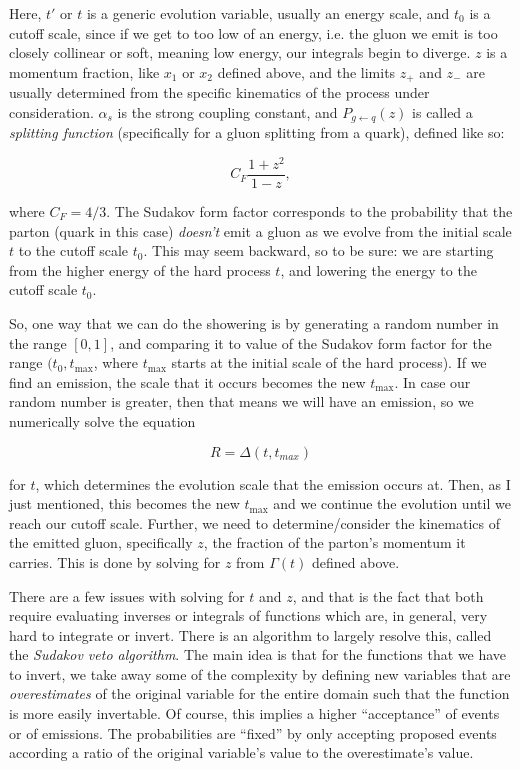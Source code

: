 Here, $t'$ or $t$ is a generic evolution variable, usually an energy scale, and $t_0$ is a cutoff scale, since if we get to too low of an energy, i.e. the gluon we emit is too closely collinear or soft, meaning low energy, our integrals begin to diverge. $z$ is a momentum fraction, like $x_1$ or $x_2$ defined above, and the limits $z_+$ and $z_-$ are usually determined from the specific kinematics of the process under consideration. $\alpha_s$ is the strong coupling constant, and $P_{g \leftarrow q}(z)$ is called a \textit{splitting function} (specifically for a gluon splitting from a quark), defined like so:

\begin{equation}
  C_F \frac{1 + z^2}{1 - z},
\end{equation}

where $C_F=4/3$. The Sudakov form factor corresponds to the probability that the parton (quark in this case) \textit{doesn't} emit a gluon as we evolve from the initial scale $t$ to the cutoff scale $t_0$. This may seem backward, so to be sure: we are starting from the higher energy of the hard process $t$, and lowering the energy to the cutoff scale $t_0$.

So, one way that we can do the showering is by generating a random number in the range $[0,1]$, and comparing it to value of the Sudakov form factor for the range $(t_0,t_{\mathrm{max}}$, where $t_{\mathrm{max}}$ starts at the initial scale of the hard process). If we find an emission, the scale that it occurs becomes the new $t_{\mathrm{max}}$. In case our random number is greater, then that means we will have an emission, so we numerically solve the equation

\begin{equation}
  R = \Delta(t,t_{max})
\end{equation}

for $t$, which determines the evolution scale that the emission occurs at. Then, as I just mentioned, this becomes the new $t_{\mathrm{max}}$ and we continue the evolution until we reach our cutoff scale. Further, we need to determine/consider the kinematics of the emitted gluon, specifically $z$, the fraction of the parton's momentum it carries. This is done by solving for $z$ from $\Gamma(t)$ defined above.

There are a few issues with solving for $t$ and $z$, and that is the fact that both require evaluating inverses or integrals of functions which are, in general, very hard to integrate or invert. There is an algorithm to largely resolve this, called the \textit{Sudakov veto algorithm}. The main idea is that for the functions that we have to invert, we take away some of the complexity by defining new variables that are \textit{overestimates} of the original variable for the entire domain such that the function is more easily invertable. Of course, this implies a higher ``acceptance'' of events or of emissions. The probabilities are ``fixed'' by only accepting proposed events according a ratio of the original variable's value to the overestimate's value.

